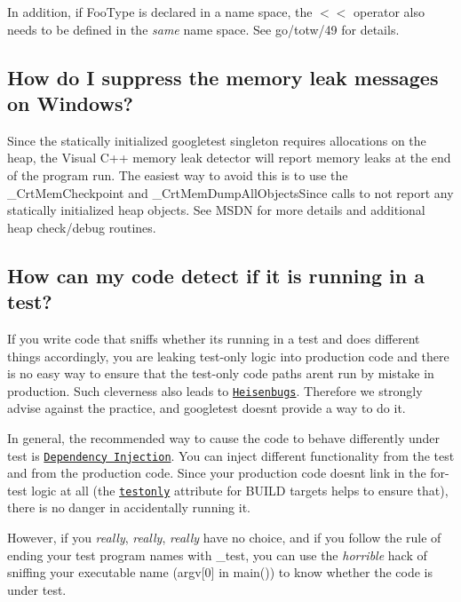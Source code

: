 In addition, if {\ttfamily Foo\+Type} is declared in a name space, the {\ttfamily $<$$<$} operator also needs to be defined in the {\itshape same} name space. See go/totw/49 for details.

\subsection*{How do I suppress the memory leak messages on Windows?}

Since the statically initialized googletest singleton requires allocations on the heap, the Visual C++ memory leak detector will report memory leaks at the end of the program run. The easiest way to avoid this is to use the {\ttfamily \+\_\+\+Crt\+Mem\+Checkpoint} and {\ttfamily \+\_\+\+Crt\+Mem\+Dump\+All\+Objects\+Since} calls to not report any statically initialized heap objects. See M\+S\+DN for more details and additional heap check/debug routines.

\subsection*{How can my code detect if it is running in a test?}

If you write code that sniffs whether it\textquotesingle{}s running in a test and does different things accordingly, you are leaking test-\/only logic into production code and there is no easy way to ensure that the test-\/only code paths aren\textquotesingle{}t run by mistake in production. Such cleverness also leads to \href{https://en.wikipedia.org/wiki/Heisenbug}{\tt Heisenbugs}. Therefore we strongly advise against the practice, and googletest doesn\textquotesingle{}t provide a way to do it.

In general, the recommended way to cause the code to behave differently under test is \href{https://en.wikipedia.org/wiki/Dependency_injection}{\tt Dependency Injection}. You can inject different functionality from the test and from the production code. Since your production code doesn\textquotesingle{}t link in the for-\/test logic at all (the \href{https://docs.bazel.build/versions/master/be/common-definitions.html#common.testonly}{\tt {\ttfamily testonly}} attribute for B\+U\+I\+LD targets helps to ensure that), there is no danger in accidentally running it.

However, if you {\itshape really}, {\itshape really}, {\itshape really} have no choice, and if you follow the rule of ending your test program names with {\ttfamily \+\_\+test}, you can use the {\itshape horrible} hack of sniffing your executable name ({\ttfamily argv\mbox{[}0\mbox{]}} in {\ttfamily main()}) to know whether the code is under test.

